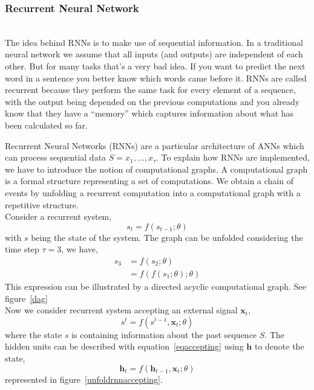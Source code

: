 
\subsubsection{Recurrent Neural Network}~\\


The idea behind RNNs is to make use of sequential information. In a traditional
neural network we assume that all inputs (and outputs) are independent of each
other. But for many tasks that’s a very bad idea. If you want to predict the
next word in a sentence you better know which words came before it. RNNs are
called recurrent because they perform the same task for every element of a
sequence, with the output being depended on the previous computations and you
already know that they have a “memory” which captures information about what
has been calculated so far.

Recurrent Neural Networks (RNNs) are a particular architecture of ANNs which can
process sequential data $S = x_{1},\dots,x_{\tau}$. To explain how RNNs are
implemented, we have to introduce the notion of computational graphs.
A computational graph is a formal structure representing a set of computations.
We obtain a chain of events by unfolding a recurrent computation into a
computational graph with a repetitive structure. \\

Consider a recurrent system,
\begin{equation}
  s_{t} = f(s_{t-1};\theta)
\end{equation}
with $s$ being the state of the system. The graph can be unfolded considering
the time step $\tau = 3$, we have,
\begin{equation}
  \begin{split}
    s_{3} & = f(s_{2};\theta) \\
          & = f(f(s_{1};\theta);\theta)
  \end{split}
  \label{recurrentsystem}
\end{equation}
This expression can be illustrated by a directed acyclic computational graph.
See figure~\ref{dag}\\


Now we consider recurrent system accepting an external signal $\bm{x}_{t}$,
\begin{equation}
  s^{t} = f(s^{t-1},\bm{x}_{t};\theta)
  \label{eqaccepting}
\end{equation}
where the state $s$ is containing information about the past sequence $S$. The
hidden units can be described with equation~\ref{eqaccepting} using $\bm{h}$ to
denote the state,
\begin{equation}
  \bm{h}_{t} = f(\bm{h}_{t-1},\bm{x}_{t};\theta)
\end{equation}
represented in figure~\ref{unfoldrnnaccepting}.\\


